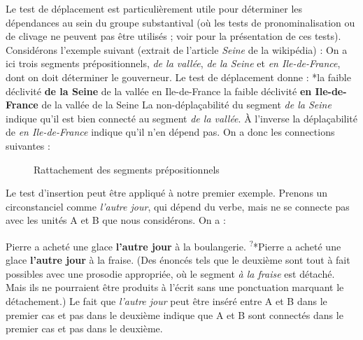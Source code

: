 Le test de déplacement est particulièrement utile pour déterminer les dépendances au sein du groupe substantival (où les tests de pronominalisation ou de clivage ne peuvent pas être utilisés ; voir  pour la présentation de ces tests). Considérons l’exemple suivant (extrait de l’article \textit{Seine} de la wikipédia) :
\z
On a ici trois segments prépositionnels, \textit{de la vallée}, \textit{de la Seine} et \textit{en Ile-de-France}, dont on doit déterminer le gouverneur. Le test de déplacement donne :
\ea
    *{la faible déclivité} \textbf{{de la Seine}}  {de la vallée en Ile-de-France}
\z
\ea
    {la faible déclivité} \textbf{{en Ile-de-France}}  {de la vallée de la Seine}
\z
La non-déplaçabilité du segment \textit{de la Seine} indique qu’il est bien connecté au segment \textit{de la vallée}. À l’inverse la déplaçabilité de \textit{en Ile-de-France} indique qu’il n’en dépend pas. On a donc les connections suivantes :

\begin{figure}
\small{}
\caption{\label{fig:}Rattachement des segments prépositionnels}
\end{figure}

Le test d’insertion peut être appliqué à notre premier exemple. Prenons un circonstanciel comme \textit{l’autre jour}, qui dépend du verbe, mais ne se connecte pas avec les unités A et B que nous considérons. On a :

\ea
 {Pierre a acheté une glace} \textbf{{l’autre jour}}  {à la boulangerie.}
 \z
\ea
    \textsuperscript{?}{*Pierre a acheté une glace} \textbf{{l’autre jour}}  {à la fraise.}
\z
(Des énoncés tels que le deuxième sont tout à fait possibles avec une prosodie appropriée, où le segment \textit{à la fraise} est détaché. Mais ils ne pourraient être produits à l’écrit sans une ponctuation marquant le détachement.) Le fait que \textit{l’autre jour} peut être inséré entre A et B dans le premier cas et pas dans le deuxième indique que A et B sont connectés dans le premier cas et pas dans le deuxième.

